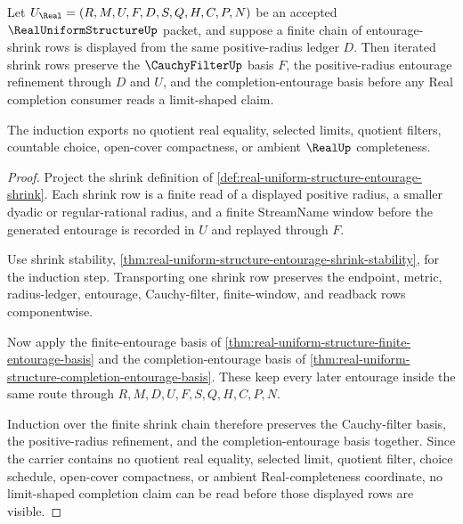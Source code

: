 \begin{theorem}
\label{thm:real-uniform-structure-cauchy-entourage-shrink-induction}
Let $U_{\Real}=(R,M,U,F,D,S,Q,H,C,P,N)$ be an accepted $\RealUniformStructureUp$ packet, and suppose a finite chain of entourage-shrink rows is displayed from the same positive-radius ledger $D$. Then iterated shrink rows preserve the $\CauchyFilterUp$ basis $F$, the positive-radius entourage refinement through $D$ and $U$, and the completion-entourage basis before any Real completion consumer reads a limit-shaped claim.

The induction exports no quotient real equality, selected limits, quotient filters, countable choice, open-cover compactness, or ambient $\RealUp$ completeness.
\end{theorem}
\begin{proof}
Project the shrink definition of \autoref{def:real-uniform-structure-entourage-shrink}. Each shrink row is a finite read of a displayed positive radius, a smaller dyadic or regular-rational radius, and a finite StreamName window before the generated entourage is recorded in $U$ and replayed through $F$.

Use shrink stability, \autoref{thm:real-uniform-structure-entourage-shrink-stability}, for the induction step. Transporting one shrink row preserves the endpoint, metric, radius-ledger, entourage, Cauchy-filter, finite-window, and readback rows componentwise.

Now apply the finite-entourage basis of \autoref{thm:real-uniform-structure-finite-entourage-basis} and the completion-entourage basis of \autoref{thm:real-uniform-structure-completion-entourage-basis}. These keep every later entourage inside the same route through $R,M,D,U,F,S,Q,H,C,P,N$.

Induction over the finite shrink chain therefore preserves the Cauchy-filter basis, the positive-radius refinement, and the completion-entourage basis together. Since the carrier contains no quotient real equality, selected limit, quotient filter, choice schedule, open-cover compactness, or ambient Real-completeness coordinate, no limit-shaped completion claim can be read before those displayed rows are visible.
\end{proof}

